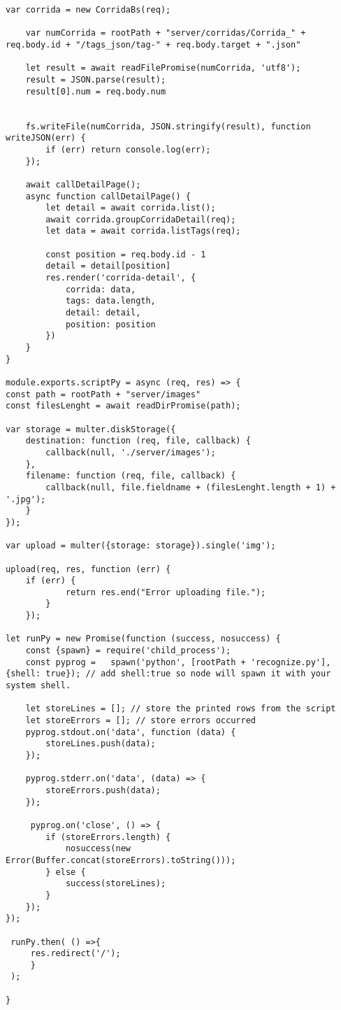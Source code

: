 \begin{lstlisting}[caption=Exemplo do código dos \textit{controllers}]
	var corrida = new CorridaBs(req);
	
	var numCorrida = rootPath + "server/corridas/Corrida_" + req.body.id + "/tags_json/tag-" + req.body.target + ".json"
	
	let result = await readFilePromise(numCorrida, 'utf8');
	result = JSON.parse(result);
	result[0].num = req.body.num
	
	
	fs.writeFile(numCorrida, JSON.stringify(result), function writeJSON(err) {
		if (err) return console.log(err);
	});
	
	await callDetailPage();
	async function callDetailPage() {
		let detail = await corrida.list();
		await corrida.groupCorridaDetail(req);
		let data = await corrida.listTags(req);
		
		const position = req.body.id - 1
		detail = detail[position]
		res.render('corrida-detail', {
			corrida: data,
			tags: data.length,
			detail: detail,
			position: position
		})
	}
}

module.exports.scriptPy = async (req, res) => {
const path = rootPath + "server/images"
const filesLenght = await readDirPromise(path);

var storage = multer.diskStorage({
	destination: function (req, file, callback) {
		callback(null, './server/images');
	},
	filename: function (req, file, callback) {
		callback(null, file.fieldname + (filesLenght.length + 1) + '.jpg');
	}
});

var upload = multer({storage: storage}).single('img');

upload(req, res, function (err) {
	if (err) {
			return res.end("Error uploading file.");
		}
	});

let runPy = new Promise(function (success, nosuccess) {
	const {spawn} = require('child_process');
	const pyprog =	 spawn('python', [rootPath + 'recognize.py'], {shell: true}); // add shell:true so node will spawn it with your system shell.

	let storeLines = []; // store the printed rows from the script
	let storeErrors = []; // store errors occurred
	pyprog.stdout.on('data', function (data) {
		storeLines.push(data);
	});

	pyprog.stderr.on('data', (data) => {
		storeErrors.push(data);
	});

	 pyprog.on('close', () => {
		if (storeErrors.length) {
			nosuccess(new Error(Buffer.concat(storeErrors).toString()));
		} else {
			success(storeLines);
		}
	});
});

 runPy.then( () =>{
	 res.redirect('/');
	 }
 );

}
\end{lstlisting}


\newpage